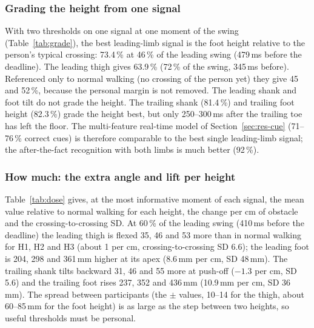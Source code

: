\begin{table}[htbp]
\centering
\caption{Crossing vs level stride from one signal (vs normal walking): nested sensitivity / specificity, chosen moment and threshold,
and the earliest moment at which a fixed-moment rule reaches at least 90\,\% of both.}
\label{tab:detect}

\end{table}

\subsubsection{Grading the height from one signal}

With two thresholds on one signal at one moment of the swing (Table~\ref{tab:grade}), the best leading-limb signal is the foot height
relative to the person's typical crossing: 73.4\,\% at 46\,\% of the leading swing (479\,ms before the deadline). The leading thigh
gives 63.9\,\% (72\,\% of the swing, 345\,ms before). Referenced only to normal walking (no crossing of the person yet) they give 45
and 52\,\%, because the personal margin is not removed. The leading shank and foot tilt do not grade the height. The trailing shank
(81.4\,\%) and trailing foot height (82.3\,\%) grade the height best, but only 250--300\,ms after the trailing toe has left the floor.
The multi-feature real-time model of Section~\ref{sec:res-cue} (71--76\,\% correct cues) is therefore comparable to the best single
leading-limb signal; the after-the-fact recognition with both limbs is much better (92\,\%).

\begin{table}[htbp]
\centering
\caption{Height from one signal at one moment of the swing (two ordered thresholds): nested accuracy, chosen moment and the device
thresholds (refitted on all participants).}
\label{tab:grade}

\end{table}

\subsubsection{How much: the extra angle and lift per height}

Table~\ref{tab:dose} gives, at the most informative moment of each signal, the mean value relative to normal walking for each height,
the change per cm of obstacle and the crossing-to-crossing SD. At 60\,\% of the leading swing (410\,ms before the deadline) the
leading thigh is flexed 35\textdegree{}, 46\textdegree{} and 53\textdegree{} more than in normal walking for H1, H2 and H3 (about
1\textdegree{} per cm, crossing-to-crossing SD 6.6\textdegree{}); the leading foot is 204, 298 and 361\,mm higher at its apex
(8.6\,mm per cm, SD 48\,mm). The trailing shank tilts backward 31\textdegree{}, 46\textdegree{} and 55\textdegree{} more at push-off
($-1.3$\textdegree{} per cm, SD 5.6\textdegree{}) and the trailing foot rises 237, 352 and 436\,mm (10.9\,mm per cm, SD 36\,mm). The
spread between participants (the $\pm$ values, 10--14\textdegree{} for the thigh, about 60--85\,mm for the foot height) is as large as the
step between two heights, so useful thresholds must be personal.

